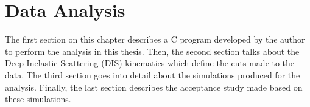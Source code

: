 \section{Data Analysis} \label{sec::dataanalysis}
    The first section on this chapter describes a C program developed by the author to perform the analysis in this thesis.
    Then, the second section talks about the Deep Inelastic Scattering (DIS) kinematics which define the cuts made to the data.
    The third section goes into detail about the simulations produced for the analysis.
    Finally, the last section describes the acceptance study made based on these simulations.

    
    
    
    
